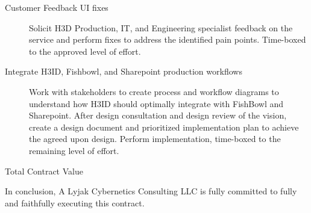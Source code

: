\documentclass[8pt, letterpaper]{awesome-cv} %
\begin{document}
\begin{cvletter}
\begin{description}
    \item[Customer Feedback UI fixes] Solicit H3D Production, IT, and Engineering specialist
      feedback on the service and perform fixes to address the identified pain points. Time-boxed to
      the approved level of effort. 

    \item[Integrate H3ID, Fishbowl, and Sharepoint production workflows] Work with stakeholders to
      create process and workflow diagrams to understand how H3ID should optimally integrate with
      FishBowl and Sharepoint. After design consultation and design review of the vision, create a
      design document and prioritized implementation plan to achieve the agreed upon design. Perform
      implementation, time-boxed to the remaining level of effort. 

    \item[Total Contract Value] 

  \end{description}

  In conclusion, A Lyjak Cybernetics Consulting LLC is fully committed to fully and faithfully
  executing this contract. \\

\end{cvletter}
 \\\\\\\\\\
 \\



\end{document}

